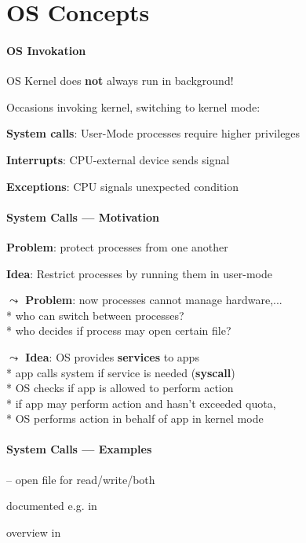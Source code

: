 \section{OS Concepts}

\paragraph{OS Invokation}
\begin{items}
	\item OS Kernel does \textbf{not} always run in background!
	\item Occasions invoking kernel, switching to kernel mode:
	\begin{enumeration}
		\item \textbf{System calls}: User-Mode processes require higher privileges
		\item \textbf{Interrupts}: CPU-external device sends signal
		\item \textbf{Exceptions}: CPU signals unexpected condition
	\end{enumeration}
\end{items}

\paragraph{System Calls --- Motivation}
\begin{items}
	\item \textbf{Problem}: protect processes from one another
	\item \textbf{Idea}: Restrict processes by running them in user-mode
	\item \textbf{\( \leadsto \) Problem}: now processes cannot manage hardware,... \\*
		who can switch between processes? \\*
		who decides if process may open certain file?
	\item \textbf{\( \leadsto \) Idea}: OS provides \textbf{services} to apps \\*
		app calls system if service is needed (\textbf{syscall}) \\*
		OS checks if app is allowed to perform action \\*
		if app may perform action and hasn't exceeded quota, \\* \phantom{x} OS performs action in behalf of app in kernel mode
\end{items}

\paragraph{System Calls --- Examples}
\begin{items}
	\item {} -- open file for read/write/both
	\item documented e.g. in 
	\item overview in 
\end{items}

